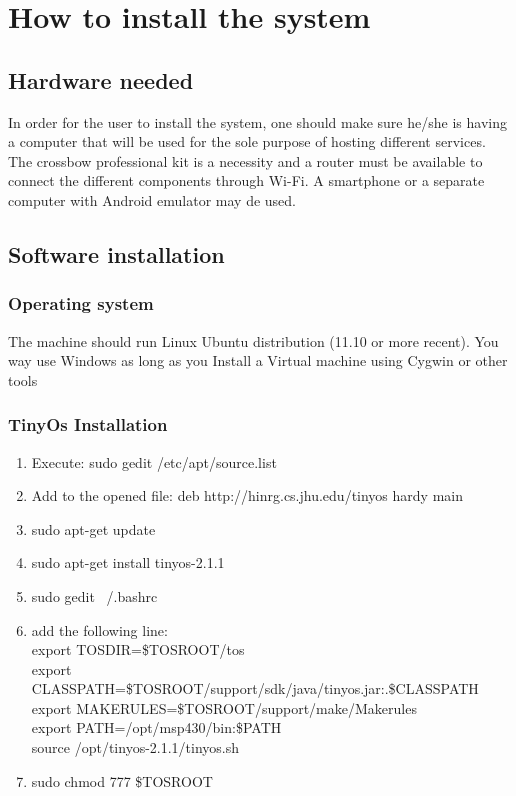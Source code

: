 \documentclass[oneside,12pt,a4paper,final]{book}
\begin{document}
\backmatter
\singlespacing

\renewcommand{\bibname}{References}
 


\doublespacing
\appendix
\chapter{How to install the system}
\section{Hardware needed}
In order for the user to install the system, one should make sure he/she is having a computer that will be used for the sole purpose of hosting different services. The crossbow professional kit is a necessity and a router must be available to connect the different components through Wi-Fi. A smartphone or a separate computer with Android emulator may de used.

\section{Software installation}

\subsection{Operating system}
The machine should run Linux Ubuntu distribution (11.10 or more recent). You way use Windows as long as you Install a Virtual machine using Cygwin or other tools
\subsection{TinyOs Installation}
\begin{enumerate}
\item Execute: sudo gedit /etc/apt/source.list
\item Add to the opened file: deb http://hinrg.cs.jhu.edu/tinyos hardy main
\item sudo apt-get update 
\item sudo apt-get install tinyos-2.1.1
\item sudo gedit ~/.bashrc
\item add the following line: \\
export TOSDIR=\$TOSROOT/tos \\
export CLASSPATH=\$TOSROOT/support/sdk/java/tinyos.jar:.\$CLASSPATH \\
export MAKERULES=\$TOSROOT/support/make/Makerules \\
export PATH=/opt/msp430/bin:\$PATH \\
source /opt/tinyos-2.1.1/tinyos.sh \\

\item sudo chmod 777 \$TOSROOT
\end{enumerate}
\end{document}
